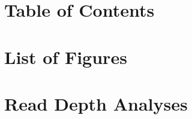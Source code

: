 \documentclass[12pt]{article}
\begin{document}
	

	\section{Table of Contents}
	\tableofcontents
	\newpage 

	\section{List of Figures}
	\listoffigures
	\newpage

	\listoftables
	\newpage

	\section{Read Depth Analyses}
	
	\newpage
	
	
	
	
\end{document}
